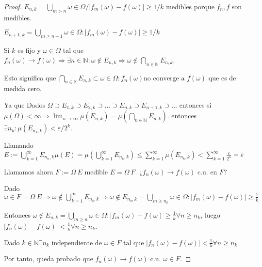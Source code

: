 \documentclass[11pt, a4paper]{article}
\theoremstyle{theorem-style}
\theoremstyle{definition-style}
\theoremstyle{remark-style}
\theoremstyle{example-style}
\begin{document}
\begin{proof}
  $E_{n,k} = \bigcup_{m > n} {\omega \in \Omega / |f_{m}(\omega) -f(\omega)|
    \geq 1/k}$ medibles porque $f_{n}, f$ son medibles.

  $E_{n+1,k} = \bigcup_{m \geq n+1} {\omega \in \Omega : |f_{m}(\omega) -
    f(\omega)| \geq 1/k}$

  Si $k$ es fijo y $\omega \in \Omega$ tal que ${f_{n}(\omega)} \rightarrow
  f(\omega) \Rightarrow \exists n \in \mathbb N : \omega \notin E_{n,k}
  \Rightarrow \omega \notin \bigcap_{n \in \mathbb N} E_{n,k}$.

  Esto significa que $\bigcap_{n \in \mathbb K} E_{n,k} \subset {\omega \in \Omega
    : f_{n}(\omega) \text{no converge a } f(\omega)} $ que es de medida cero.

  Ya que Dados $\Omega \supset E_{1,k} \supset E_{2,k} \supset \hdots \supset E_{n,k} \supset
  E_{n+1,k} \supset \hdots$ entonces si $\mu(\Omega) < \infty \Rightarrow
  \lim_{n\to\infty} \mu(E_{n,k}) = \mu(\bigcap_{n \in \mathbb N}
  E_{n,k})$. entonces $\exists n_{k} : \mu(E_{n_{k},k}) <
  \varepsilon/2^{k}$.

  Llamando $E := \bigcup_{k=1}^{\infty} E_{n_{n},k} \mu(E) =
  \mu(\bigcup_{k=1}^{\infty}E_{n_{k},k}) \leq \sum_{k=1}^{\infty}
  \mu(E_{n_{k},k}) < \sum_{k=1}^{\infty} \frac{\varepsilon}{2^{k}} =
  \varepsilon$

  Llamamos ahora $F:=\Omega \ E $ medible $E = \Omega \
  F$. ¿$f_{n}(\omega) \rightarrow f(\omega)$ c.u. en $F$?

  Dado $\omega \in F = \Omega \ E \Rightarrow \omega \notin
  \bigcup_{k=1}^{\infty} E_{n_{k},k} \Rightarrow \omega \notin E_{n_{k},k}
  = \bigcup_{m \geq n_{k}} {\omega \in \Omega : |f_{m}(\omega) -
    f(\omega)| \geq \frac{1}{k} }$

  Entonces $\omega \notin E_{n,k} = \bigcup_{m\geq n} {\omega \in \Omega :
    |f_{m}(\omega) - f(\omega) \geq \frac{1}{k}} \forall n \geq n_{k}$,
  luego $|f_{n}(\omega)- f(\omega)| < \frac{1}{k} \forall n \geq n_{k}$.

  Dado $k \in \mathbb N \exists n_{k} \text{ independiente de } \omega \in F
  \text{ tal que } |f_{n}(\omega) -
  f(\omega)| < \frac{1}{k} \forall n \geq n_{k}$

  Por tanto, queda probado que ${f_{n}(\omega)} \rightarrow f(\omega)$
  c.u. $\omega \in F$.


\end{proof}
\end{document}
